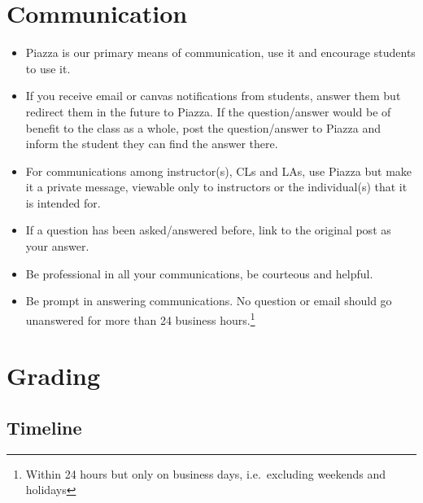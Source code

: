 \documentclass[12pt]{scrartcl}
\begin{document}
\section*{Communication}

\begin{itemize}
  \item Piazza is our primary means of communication, use it and encourage 
students to use it.  
  \item If you receive email or canvas notifications from students, answer 
  them but redirect them in the future to Piazza.  If the question/answer
  would be of benefit to the class as a whole, post the question/answer
  to Piazza and inform the student they can find the answer there.
  \item For communications among instructor(s), CLs and LAs, use Piazza 
  but make it a private message, viewable only to instructors or the
  individual(s) that it is intended for.
  \item If a question has been asked/answered before, link to the original
  post as your answer.
  \item Be professional in all your communications, be courteous and
  helpful.  
  \item Be prompt in answering communications.  No question or email 
  should go unanswered for more than 24 business hours.\footnote{Within 24 hours but only
  on business days, i.e.\ excluding weekends and holidays}
\end{itemize}

\section*{Grading}

\subsection*{Timeline}
\end{document}
